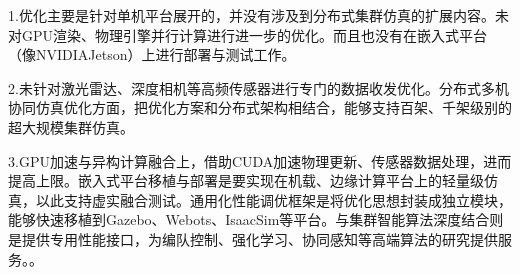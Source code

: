 1.优化主要是针对单机平台展开的，并没有涉及到分布式集群仿真的扩展内容。未对GPU渲染、物理引擎并行计算进行进一步的优化。而且也没有在嵌入式平台（像NVIDIAJetson）上进行部署与测试工作。

2.未针对激光雷达、深度相机等高频传感器进行专门的数据收发优化。分布式多机协同仿真优化方面，把优化方案和分布式架构相结合，能够支持百架、千架级别的超大规模集群仿真。

3.GPU加速与异构计算融合上，借助CUDA加速物理更新、传感器数据处理，进而提高上限。嵌入式平台移植与部署是要实现在机载、边缘计算平台上的轻量级仿真，以此支持虚实融合测试。通用化性能调优框架是将优化思想封装成独立模块，能够快速移植到Gazebo、Webots、IsaacSim等平台。与集群智能算法深度结合则是提供专用性能接口，为编队控制、强化学习、协同感知等高端算法的研究提供服务。。
